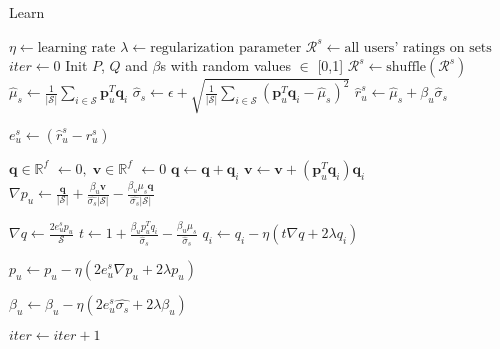 \begin{algorithm}
  \caption{Learn \VO}
  \label{alg:alg-lfs-voarm}
  \begin{algorithmic}[1]
    \State $\eta \gets  \text{learning rate}$
    \State $\lambda \gets \text{regularization parameter}$
    \State $\mathcal{R}^s \gets \text{all users' ratings on sets}$  
    \State $iter \gets 0$
    \State Init $P$, $Q$ and $\beta$s with random values $\in$ [0,1]
      \State $\mathcal{R}^s \gets \text{shuffle}(\mathcal{R}^s)$
        \State $\hat{\mu}_s \gets  \frac{1}{|\mathcal{S}|} \sum_{i \in \mathcal{S}} \bm{p}_u^T\bm{q}_i$ 
        \State $\hat{\sigma}_s \gets  \epsilon + \sqrt{\frac{1}{|\mathcal{S}|} \sum_{i \in
          \mathcal{S}}  (\bm{p}_u^T\bm{q}_i - \hat{\mu}_s)^2}$
          \State $\hat{r}_u^s \gets \hat{\mu}_s + \beta_u \hat{\sigma}_s$

        \State $e_{u}^s \gets (\hat{r}_{u}^s - r_{u}^s)$
        

        \State $\bm{q} \in \mathbb{R}^f$  $\gets 0, \;\bm{v} \in \mathbb{R}^f$  $\gets 0$
          \State $\bm{q} \gets \bm{q} + \bm{q}_i$
          \State $\bm{v} \gets \bm{v} + (\bm{p}_u^T\bm{q}_i)\bm{q}_i$
        \EndFor
        \State $\nabla p_u \gets \frac{\bm{q}}{|\mathcal{S}|} 
          + \frac{\beta_u \bm{v}}{\hat{\sigma_s}|\mathcal{S}|}
          - \frac{\beta_u \mu_s \bm{q}}{\hat{\sigma_s} |\mathcal{S}|}$


        \State $\nabla q \gets \frac{2e_{u}^s p_u}{\mathcal{S}}$
          \State $t \gets 1 + \frac{\beta_u p_u^Tq_i}{\hat{\sigma}_s} 
            - \frac{\beta_u \mu_s}{\hat{\sigma}_s}  $
            \State $q_i \gets q_i - \eta(t \nabla q + 2\lambda q_i)$
        \EndFor

        \State $p_u \gets p_u - \eta(2 e_{u}^s \nabla p_u + 2 \lambda p_u )$
        
        \State $\beta_u \gets \beta_u - \eta(2 e_{u}^s \hat{\sigma_s} +
        2\lambda\beta_u)$ 

      \EndFor
      \State $iter \gets iter + 1$
    \EndWhile
    \EndProcedure
  \end{algorithmic}
\end{algorithm}



